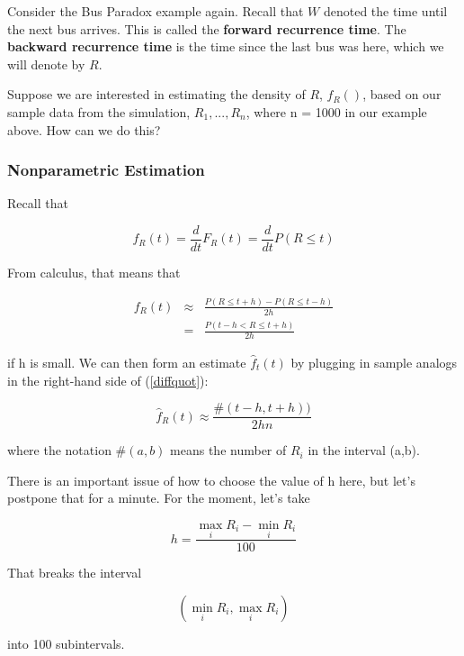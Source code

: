 Consider the Bus Paradox example again.  Recall that $W$ denoted the
time until the next bus arrives.  This is called the {\bf forward
recurrence time}.  The {\bf backward recurrence time} is the time since
the last bus was here, which we will denote by $R$.  

Suppose we are interested in estimating the density of $R$, $f_R()$,
based on our sample data from the simulation, $R_1,...,R_n$, where n =
1000 in our example above.  How can we do this?

\subsubsection{Nonparametric Estimation}

Recall that 

\begin{equation}
f_R(t) = \frac{d}{dt} F_R(t) =  \frac{d}{dt} P(R \leq t)
\end{equation}

From calculus, that means that

\begin{eqnarray}
\label{diffquot}
f_R(t) &\approx& \frac{P(R \leq t+h) - P(R \leq t-h)}{2h} \\
&=& \frac{P(t-h < R \leq t+h)}{2h}
\end{eqnarray}

if h is small.  We can then form an estimate $\hat{f}_t(t)$ by plugging
in sample analogs in the right-hand side of (\ref{diffquot}):

\begin{equation}
\label{prehisto}
\hat{f}_R(t) \approx \frac{\#(t-h,t+h))}{2hn} 
\end{equation}

where the notation $\#(a,b)$ means the number of $R_i$ in the interval
(a,b).

There is an important issue of how to choose the value of h here, but
let's postpone that for a minute.  For the moment, let's take 

\begin{equation}
h = \frac{\max_i R_i - \min_iR_i}{100}
\end{equation}

That breaks the interval 

\begin{equation}
\label{hint}
(\min_iR_i, \max_i R_i )
\end{equation}

into 100 subintervals.  

